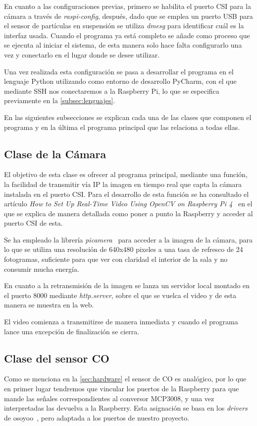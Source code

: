En cuanto a las configuraciones previas, primero se habilita el puerto CSI para la cámara a través de \textit{raspi-config}, después, dado que se emplea un puerto USB para el sensor de partículas en suspensión se utiliza \textit{dmesg} para identificar cuál es la interfaz usada. Cuando el programa ya está completo se añade como proceso que se ejecuta al iniciar el sistema, de esta manera solo hace falta configurarlo una vez y conectarlo en el lugar donde se desee utilizar.
\pagebreak

Una vez realizada esta configuración se pasa a desarrollar el programa en el lenguaje Python utilizando como entorno de desarrollo PyCharm, con el que mediante SSH nos conectaremos a la Raspberry Pi, lo que se especifica previamente en la \autoref{subsec:lenguajes}.

En las siguientes subsecciones se explican cada una de las clases que componen el programa y en la última el programa principal que las relaciona a todas ellas.

\subsection{Clase de la Cámara}\label{subsec:clase-de-la-cámara}
El objetivo de esta clase es ofrecer al programa principal, mediante una función, la facilidad de transmitir vía IP la imagen en tiempo real que capta la cámara instalada en el puerto CSI. Para el desarrollo de esta función se ha consultado el artículo \textit{How to Set Up Real-Time Video Using OpenCV on Raspberry Pi 4}~\cite{addison_how_nodate} en el que se explica de manera detallada como poner a punto la Raspberry y acceder al puerto CSI de esta.

Se ha empleado la librería \textit{picamera}~\cite{jones_picamera_nodate} para acceder a la imagen de la cámara, para lo que se utiliza una resolución de 640x480 pixeles a una tasa de refresco de 24 fotogramas, suficiente para que ver con claridad el interior de la sala y no consumir mucha energía.

En cuanto a la retransmisión de la imagen se lanza un servidor local montado en el puerto 8000 mediante \textit{http.server}, sobre el que se vuelca el video y de esta manera se muestra en la web.

El video comienza a transmitirse de manera inmediata y cuando el programa lance una excepción de finalización se cierra.

\subsection{Clase del sensor CO}\label{subsec:clase-del-sensor-co}
Como se menciona en la \autoref{sec:hardware} el sensor de CO es analógico, por lo que en primer lugar tendremos que vincular los puertos de la Raspberry para que mande las señales correspondientes al conversor MCP3008, y una vez interpretadas las devuelva a la Raspberry. Esta asignación se basa en los \textit{drivers} de osoyoo~\cite{osoyoo_osoyoodriver_2021}, pero adaptada a los puertos de nuestro proyecto.

